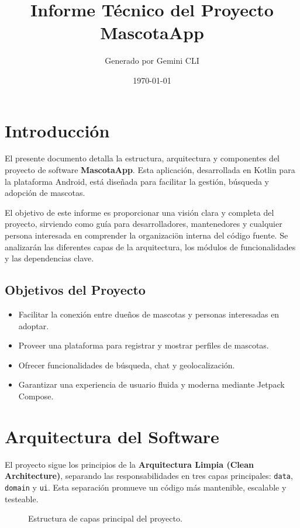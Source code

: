 \documentclass[12pt, a4paper]{article}
\title{
    \textbf{Informe Técnico del Proyecto}\\
    \vspace{0.5cm}
    \Large MascotaApp
}
\author{Generado por Gemini CLI}
\date{\today}
\begin{document}
\maketitle
\thispagestyle{empty}
\newpage

\tableofcontents
\thispagestyle{empty}
\newpage

\section{Introducción}
El presente documento detalla la estructura, arquitectura y componentes del proyecto de software \textbf{MascotaApp}. Esta aplicación, desarrollada en Kotlin para la plataforma Android, está diseñada para facilitar la gestión, búsqueda y adopción de mascotas.

El objetivo de este informe es proporcionar una visión clara y completa del proyecto, sirviendo como guía para desarrolladores, mantenedores y cualquier persona interesada en comprender la organizaci\"on interna del código fuente. Se analizarán las diferentes capas de la arquitectura, los módulos de funcionalidades y las dependencias clave.

\subsection{Objetivos del Proyecto}
\begin{itemize}
    \item Facilitar la conexión entre dueños de mascotas y personas interesadas en adoptar.
    \item Proveer una plataforma para registrar y mostrar perfiles de mascotas.
    \item Ofrecer funcionalidades de búsqueda, chat y geolocalización.
    \item Garantizar una experiencia de usuario fluida y moderna mediante Jetpack Compose.
\end{itemize}

\newpage

\section{Arquitectura del Software}
El proyecto sigue los principios de la \textbf{Arquitectura Limpia (Clean Architecture)}, separando las responsabilidades en tres capas principales: \texttt{data}, \texttt{domain} y \texttt{ui}. Esta separación promueve un código más mantenible, escalable y testeable.

\begin{figure}[h]
    \centering
    \caption{Estructura de capas principal del proyecto.}
\end{figure}
\end{document}
